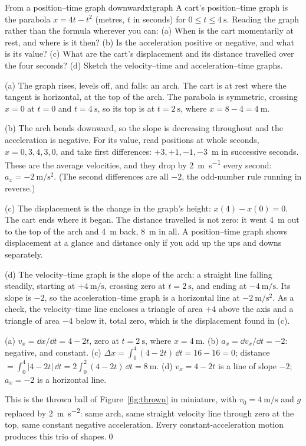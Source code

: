 \begin{example}{From a position--time graph downward}{xtgraph}
A cart's position--time graph is the parabola $x = 4t - t^2$ (metres, $t$ in seconds) for $0 \le t \le \SI{4}{\second}$. Reading the graph rather than the formula wherever you can: (a) When is the cart momentarily at rest, and where is it then? (b) Is the acceleration positive or negative, and what is its value? (c) What are the cart's displacement and its distance travelled over the four seconds? (d) Sketch the velocity--time and acceleration--time graphs.

\elem (a) The graph rises, levels off, and falls: an arch. The cart is at rest where the tangent is horizontal, at the top of the arch. The parabola is symmetric, crossing $x = 0$ at $t = 0$ and $t = \SI{4}{\second}$, so its top is at $t = \SI{2}{\second}$, where $x = 8 - 4 = \SI{4}{\metre}$.

(b) The arch bends downward, so the slope is decreasing throughout and the acceleration is negative. For its value, read positions at whole seconds, $x = 0, 3, 4, 3, 0$, and take first differences: $+3, +1, -1, -3$~m in successive seconds. These are the average velocities, and they drop by \SI{2}{\metre\per\second} every second: $a_x = \SI{-2}{\metre\per\second\squared}$. (The second differences are all $-2$, the odd-number rule running in reverse.)

(c) The displacement is the change in the graph's height: $x(4) - x(0) = 0$. The cart ends where it began. The distance travelled is not zero: it went \SI{4}{\metre} out to the top of the arch and \SI{4}{\metre} back, \SI{8}{\metre} in all. A position--time graph shows displacement at a glance and distance only if you add up the ups and downs separately.

(d) The velocity--time graph is the slope of the arch: a straight line falling steadily, starting at $+\SI{4}{\metre\per\second}$, crossing zero at $t = \SI{2}{\second}$, and ending at $\SI{-4}{\metre\per\second}$. Its slope is $-2$, so the acceleration--time graph is a horizontal line at $\SI{-2}{\metre\per\second\squared}$. As a check, the velocity--time line encloses a triangle of area $+4$ above the axis and a triangle of area $-4$ below it, total zero, which is the displacement found in (c).

\calc (a) $v_x = \dd x/\dd t = 4 - 2t$, zero at $t = \SI{2}{\second}$, where $x = \SI{4}{\metre}$. (b) $a_x = \dd v_x/\dd t = -2$: negative, and constant. (c) $\Delta x = \int_0^4 (4 - 2t)\,\dd t = 16 - 16 = 0$; distance $= \int_0^4 |4 - 2t|\,\dd t = 2\int_0^2 (4 - 2t)\,\dd t = \SI{8}{\metre}$. (d) $v_x = 4 - 2t$ is a line of slope $-2$; $a_x = -2$ is a horizontal line.

This is the thrown ball of Figure~\ref{fig:thrown} in miniature, with $v_0 = \SI{4}{\metre\per\second}$ and $g$ replaced by \SI{2}{\metre\per\second\squared}: same arch, same straight velocity line through zero at the top, same constant negative acceleration. Every constant-acceleration motion produces this trio of shapes.\qed
\end{example}

